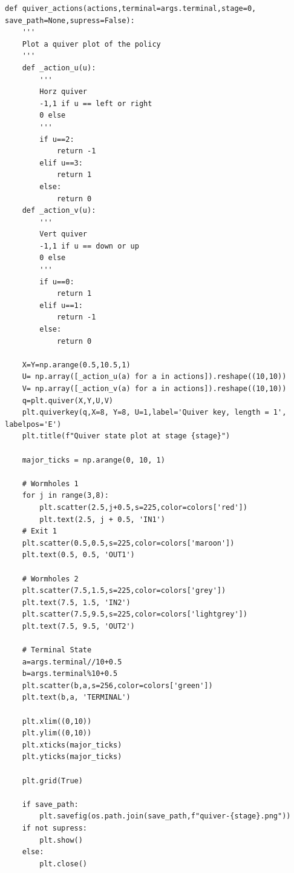 \begin{lstlisting}
def quiver_actions(actions,terminal=args.terminal,stage=0, save_path=None,supress=False):
    '''
    Plot a quiver plot of the policy
    '''
    def _action_u(u):
        '''
        Horz quiver
        -1,1 if u == left or right
        0 else
        '''
        if u==2:
            return -1
        elif u==3:
            return 1
        else:
            return 0
    def _action_v(u):
        '''
        Vert quiver
        -1,1 if u == down or up
        0 else
        '''
        if u==0:
            return 1
        elif u==1:
            return -1
        else:
            return 0
    
    X=Y=np.arange(0.5,10.5,1)
    U= np.array([_action_u(a) for a in actions]).reshape((10,10))
    V= np.array([_action_v(a) for a in actions]).reshape((10,10))
    q=plt.quiver(X,Y,U,V)
    plt.quiverkey(q,X=8, Y=8, U=1,label='Quiver key, length = 1', labelpos='E')
    plt.title(f"Quiver state plot at stage {stage}")

    major_ticks = np.arange(0, 10, 1)

    # Wormholes 1
    for j in range(3,8):
        plt.scatter(2.5,j+0.5,s=225,color=colors['red'])
        plt.text(2.5, j + 0.5, 'IN1')
    # Exit 1
    plt.scatter(0.5,0.5,s=225,color=colors['maroon'])
    plt.text(0.5, 0.5, 'OUT1')

    # Wormholes 2
    plt.scatter(7.5,1.5,s=225,color=colors['grey'])
    plt.text(7.5, 1.5, 'IN2')
    plt.scatter(7.5,9.5,s=225,color=colors['lightgrey'])
    plt.text(7.5, 9.5, 'OUT2')

    # Terminal State
    a=args.terminal//10+0.5
    b=args.terminal%10+0.5
    plt.scatter(b,a,s=256,color=colors['green'])
    plt.text(b,a, 'TERMINAL')

    plt.xlim((0,10))
    plt.ylim((0,10))
    plt.xticks(major_ticks)
    plt.yticks(major_ticks)

    plt.grid(True)

    if save_path:
        plt.savefig(os.path.join(save_path,f"quiver-{stage}.png"))
    if not supress:
        plt.show()
    else:
        plt.close()
\end{lstlisting}






